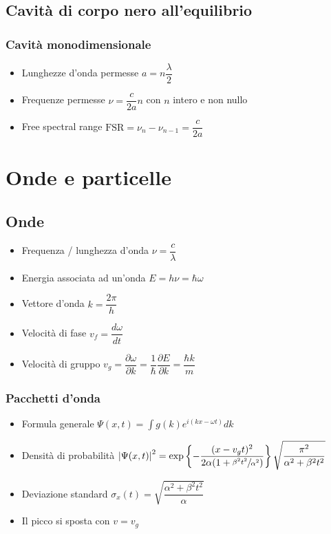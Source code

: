 \documentclass{article}
\begin{document}
\subsection{Cavità di corpo nero all'equilibrio}
\subsubsection{Cavità monodimensionale}
\begin{itemize}
  \item Lunghezze d'onda permesse \( a = n \dfrac{\lambda}{2} \)
  \item Frequenze permesse \( \nu = \dfrac{c}{2a} n \) con \( n \) intero e non nullo
  \item Free spectral range \( \text{FSR} = \nu_n - \nu_{n-1} = \dfrac{c}{2a} \)
\end{itemize}

\section{Onde e particelle}
\subsection{Onde}
\begin{itemize}
  \item Frequenza / lunghezza d'onda \( \nu = \dfrac{c}{\lambda} \)
  \item Energia associata ad un'onda \( E = h \nu = \hbar \omega \)
  \item Vettore d'onda \( k = \dfrac{2 \pi}{h} \)
  \item Velocità di fase \( v_f = \dfrac{d \omega}{d t}\)
  \item Velocità di gruppo \( v_g = \dfrac{\partial \omega}{\partial k} = \dfrac{1}{\hbar} \dfrac{\partial E}{\partial k} =\dfrac{\hbar k}{m} \)
\end{itemize}

\subsubsection{Pacchetti d'onda}
\begin{itemize}
  \item Formula generale \( \Psi(x, t) = \int{g(k) e^{i (kx- \omega t)} dk}  \)
  \item Densità di probabilità \( \left| \Psi(x, t) \right| ^ 2 = \exp\left\{-\dfrac{(x-v_g t) ^ 2}{2 \alpha (1 + \sfrac{\beta^2 t^2}{\alpha^2})}\right\} \sqrt{\dfrac{\pi^2}{\alpha^2 + \beta^2 t^2}} \)
  \item Deviazione standard \( \sigma_x (t) = \sqrt{ \dfrac{\alpha^2 + \beta^2 t^2}{\alpha} } \)
  \item Il picco si sposta con \( v = v_g \)
\end{itemize}
\end{document}
